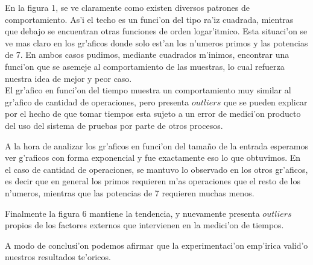 En la figura 1, se ve claramente como existen diversos patrones de comportamiento. As'i el techo es un funci'on del tipo ra'iz 
cuadrada, mientras que debajo se encuentran otras funciones de orden logar'itmico. Esta situaci'on se ve mas claro en los 
gr'aficos donde solo est'an los n'umeros primos y las potencias de 7. En ambos casos pudimos, mediante cuadrados m'inimos, 
encontrar una funci'on que se asemeje al comportamiento de las muestras, lo cual refuerza nuestra idea de mejor y peor caso.\\
El gr'afico en funci'on del tiempo muestra un comportamiento muy similar al gr'afico de cantidad de operaciones, pero presenta 
$outliers$ que se pueden explicar por el hecho de que tomar tiempos esta sujeto a un error de medici'on producto del uso del sistema
de pruebas por parte de otros procesos.

A la hora de analizar los gr'aficos en funci'on del tama\~{n}o de la entrada esperamos ver g'raficos con forma exponencial 
y fue exactamente eso lo que obtuvimos. En el caso de cantidad de operaciones, se mantuvo lo observado en los otros gr'aficos, 
es decir que en general los primos requieren m'as operaciones que el resto de los n'umeros, mientras que las potencias de 7 
requieren muchas menos.

Finalmente la figura 6 mantiene la tendencia, y nuevamente presenta $outliers$ propios de los factores externos que intervienen 
en la medici'on de tiempos.

A modo de conclusi'on podemos afirmar que la experimentaci'on emp'irica valid'o nuestros resultados te'oricos.
